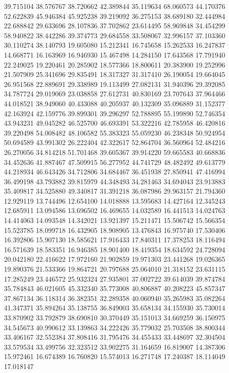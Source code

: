39.715104
38.576767
38.720662
42.389844
35.119634
68.060573
44.170376
52.622839
45.946384
45.925238
39.219092
36.275153
38.689180
32.444984
22.688842
29.633696
28.107836
37.702862
23.614495
58.969848
34.454299
58.940822
38.442286
39.374773
29.684558
33.508067
32.996157
37.103360
30.110274
38.140793
19.605080
15.212341
16.745658
15.262533
16.247837
14.668771
16.163969
16.946930
15.467498
14.284150
17.643568
17.791940
22.249025
19.220461
20.285902
18.577366
18.800611
20.383900
19.252996
21.507909
25.341696
29.835491
18.317327
31.317410
26.190054
19.664045
26.951568
22.889691
29.338989
19.113499
27.082131
31.940396
29.392085
34.787724
29.019069
23.038858
27.612731
40.830169
23.707643
37.964466
44.018521
38.949060
40.433088
40.205937
40.132309
35.096889
31.152377
42.163924
42.159776
39.899301
39.296297
52.788895
55.199890
52.746354
43.943231
49.045282
46.525700
46.693391
53.322216
42.785958
46.420816
39.220498
54.008482
48.106582
55.383323
55.059230
46.238348
50.924954
50.694589
43.991302
26.222404
42.322617
52.864704
36.560964
52.484216
26.270056
34.814218
51.701468
39.605367
39.914220
59.665583
40.668836
34.452636
41.887467
47.509915
56.277952
44.741729
48.482492
49.613779
44.218934
46.643426
34.712806
34.684467
36.451938
27.850941
47.416994
36.499198
43.793882
39.815979
44.348493
34.281463
34.694043
23.913883
35.409817
34.525880
49.340817
31.391218
36.087986
29.963157
21.794360
12.929119
13.744496
12.654100
14.018888
13.595683
14.427164
12.345243
12.685911
13.094586
13.696502
16.469655
14.032589
16.441513
14.024763
14.414063
14.093548
14.342021
13.921397
15.211471
15.506742
15.566354
15.523785
18.099718
16.432905
18.908905
13.476843
16.975740
17.530406
16.392806
15.907130
18.585621
17.916433
17.840311
17.378253
18.116494
16.571639
18.583351
16.946385
18.901400
18.419354
18.634592
24.728094
20.042180
22.416622
17.972160
21.902859
19.971303
23.441268
19.026365
19.890376
21.533366
19.864721
20.797688
25.064010
21.318152
23.631115
17.285249
23.446572
25.932324
27.935801
37.002722
39.614039
39.874784
35.784843
46.021605
45.332340
35.773008
40.806887
40.208223
45.857347
37.867134
36.118314
36.382351
32.289358
40.060940
35.265983
35.082264
41.347371
35.894264
35.138755
36.849003
35.658134
34.155930
35.730014
33.870902
33.792879
38.690810
30.370449
35.151013
34.669259
36.150975
34.545673
40.990612
33.139863
34.222426
35.779032
25.703508
38.800344
33.406167
32.552384
37.808416
31.795476
34.455433
33.448697
32.304504
33.579534
33.499756
32.323512
33.902275
31.164659
16.819007
14.387306
15.972461
16.674389
16.760820
15.574013
16.271748
17.240387
18.114049
17.018147
